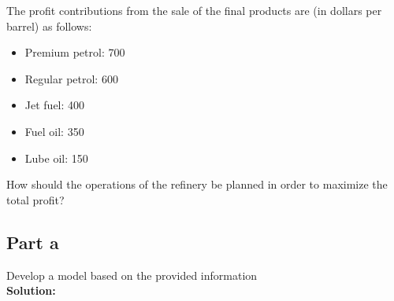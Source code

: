 \documentclass[11pt]{article}
\begin{document}
The profit contributions from the sale of the final products are (in dollars per barrel) as follows:
\begin{itemize}
    \item Premium petrol: 700
    \item Regular petrol: 600
    \item Jet fuel: 400
    \item Fuel oil: 350
    \item Lube oil: 150
\end{itemize}

How should the operations of the refinery be planned in order to maximize the total profit?
\subsection{Part a}
Develop a model based on the provided information
\\
\textbf{Solution: }
\end{document}
